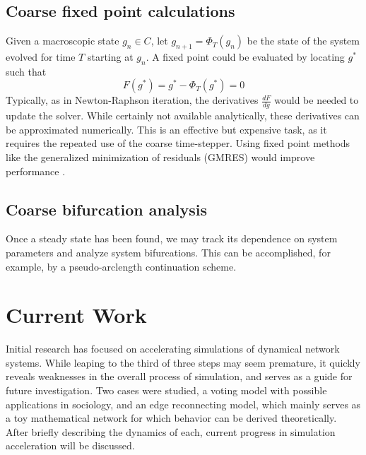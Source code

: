 \documentclass[11pt]{article}
\begin{document}
\subsection{Coarse fixed point calculations}
\indent Given a macroscopic state $g_{n} \in C$, let $g_{n+1} = \Phi_{T}(g_{n})$ be the state of the system evolved for time $T$ starting at $g_{n}$. A fixed point could be evaluated by locating $g^{*}$ such that 
\[
F(g^{*}) = g^{*} - \Phi_{T}(g^{*}) = 0
\]
Typically, as in Newton-Raphson iteration, the derivatives $\frac{dF}{dg}$ would be needed to update the solver. While certainly not available analytically, these derivatives can be approximated numerically. This is an effective but expensive task, as it requires the repeated use of the coarse time-stepper. Using fixed point methods like the generalized minimization of residuals (GMRES) would improve performance \cite{GMRES}.
\subsection{Coarse bifurcation analysis}
Once a steady state has been found, we may track its dependence on system parameters and analyze system bifurcations. This can be accomplished, for example, by a pseudo-arclength continuation scheme.
\section{Current Work}
\indent Initial research has focused on accelerating simulations of dynamical network systems. While leaping to the third of three steps may seem premature, it quickly reveals weaknesses in the overall process of simulation, and serves as a guide for future investigation. Two cases were studied, a voting model with possible applications in sociology, and an edge reconnecting model, which mainly serves as a toy mathematical network for which behavior can be derived theoretically. After briefly describing the dynamics of each, current progress in simulation acceleration will be discussed.
\end{document}

